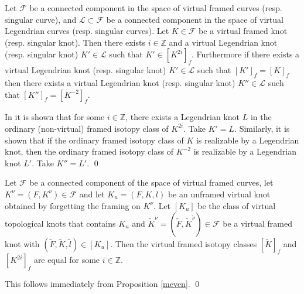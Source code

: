 \begin{prop}  \label{prop2i}
Let $\mathcal{F}$ be a connected component in the space of virtual framed curves (resp. singular curve), and $\mathcal{L}\subset\mathcal{F}$ be a connected component in the space of virtual Legendrian curves (resp. singular curves).  Let $K\in\mathcal{F}$ be a virtual framed knot (resp. singular knot). Then there exists $i\in\mathbb{Z}$ and a virtual Legendrian knot (resp. singular knot) $K'\in \mathcal{L}$ such that $K'\in [K^{2i}]_f$.  Furthermore if there exists a virtual Legendrian knot (resp. singular knot) $K'\in \mathcal{L}$ such that $[K']_f = [K]_f$ then there exists a virtual Legendrian knot (resp. singular knot) $K''\in\mathcal{L}$ such that $[K'']_f = [K^{-2}]_f$.
\end{prop}
\pp In \cite{Chernov} it is shown that for some $i \in \mathbb{Z}$, there exists a Legendrian knot $L$ in the ordinary (non-virtual) framed isotopy class of $K^{2i}$.   Take $K'=L$.  Similarly, it is shown that if the ordinary framed isotopy class of $K$ is realizable by a Legendrian knot, then the ordinary framed isotopy class of $K^{-2}$ is realizable by a Legendrian knot $L'$.  Take $K''=L'$.
\qed
\begin{prop} \label{conncomp}  Let $\mathcal{F}$ be a connected component of the space of virtual framed curves, let $K^\nu=(F,K^\nu)\in \mathcal{F}$ and let $K_u=(F,K,l)$ be an unframed virtual knot obtained by forgetting the framing on $K^\nu$. Let $[K_u]$ be the class of virtual topological knots that contains $K_u$ and $\tilde{K}^{\nu} = (\tilde{F}, \tilde{K}^{\tilde{\nu}})\in \mathcal{F}$ be a virtual framed knot with $(\tilde{F}, \tilde{K}, \tilde{l})\in [K_u]$.  Then the virtual framed isotopy classes $[\tilde{K}]_f$ and $[K^{2i}]_f$ are equal for some $i\in\mathbb{Z}$. 
\end{prop}
\pp This follows immediately from Proposition \ref{meven}.
\qed




% 
% 
% 


